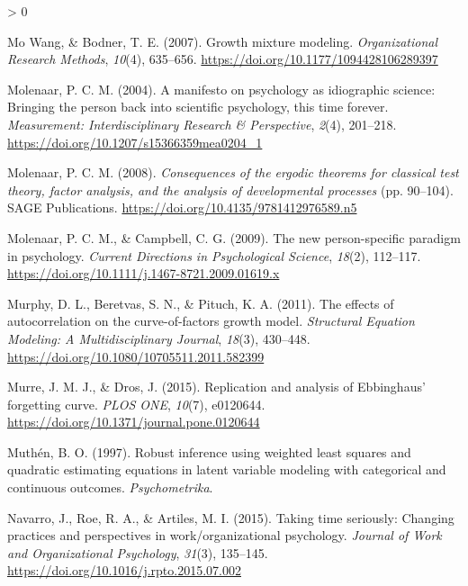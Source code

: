 \documentclass[
12pt, %
twoside,
english]{guelphthesis}
\newlength{\cslhangindent}
\newenvironment{CSLReferences}[2] %
 {%
  \setlength{\parindent}{0pt}
  \ifodd #1 \everypar{\setlength{\hangindent}{\cslhangindent}}\ignorespaces\fi
  \ifnum #2 > 0
  \setlength{\parskip}{\linespacing{2}}
  \fi
 }%
 {}
\theoremstyle{definition}
\theoremstyle{definition}
\theoremstyle{definition}
\theoremstyle{definition}
\theoremstyle{remark}
\begin{document}
\begin{CSLReferences}{1}{0}
\leavevmode{}%
Mo Wang, \& Bodner, T. E. (2007). Growth mixture modeling. \emph{Organizational Research Methods}, \emph{10}(4), 635--656. \url{https://doi.org/10.1177/1094428106289397}

\leavevmode{}%
Molenaar, P. C. M. (2004). A manifesto on psychology as idiographic science: Bringing the person back into scientific psychology, this time forever. \emph{Measurement: Interdisciplinary Research \& Perspective}, \emph{2}(4), 201--218. \url{https://doi.org/10.1207/s15366359mea0204_1}

\leavevmode{}%
Molenaar, P. C. M. (2008). \emph{Consequences of the ergodic theorems for classical test theory, factor analysis, and the analysis of developmental processes} (pp. 90--104). SAGE Publications. \url{https://doi.org/10.4135/9781412976589.n5}

\leavevmode{}%
Molenaar, P. C. M., \& Campbell, C. G. (2009). The new person-specific paradigm in psychology. \emph{Current Directions in Psychological Science}, \emph{18}(2), 112--117. \url{https://doi.org/10.1111/j.1467-8721.2009.01619.x}

\leavevmode{}%
Murphy, D. L., Beretvas, S. N., \& Pituch, K. A. (2011). The effects of autocorrelation on the curve-of-factors growth model. \emph{Structural Equation Modeling: A Multidisciplinary Journal}, \emph{18}(3), 430--448. \url{https://doi.org/10.1080/10705511.2011.582399}

\leavevmode{}%
Murre, J. M. J., \& Dros, J. (2015). Replication and analysis of Ebbinghaus{'} forgetting curve. \emph{PLOS ONE}, \emph{10}(7), e0120644. \url{https://doi.org/10.1371/journal.pone.0120644}

\leavevmode{}%
Muthén, B. O. (1997). Robust inference using weighted least squares and quadratic estimating equations in latent variable modeling with categorical and continuous outcomes. \emph{Psychometrika}.

\leavevmode{}%
Navarro, J., Roe, R. A., \& Artiles, M. I. (2015). Taking time seriously: Changing practices and perspectives in work/organizational psychology. \emph{Journal of Work and Organizational Psychology}, \emph{31}(3), 135--145. \url{https://doi.org/10.1016/j.rpto.2015.07.002}


\end{CSLReferences}
\end{document}
